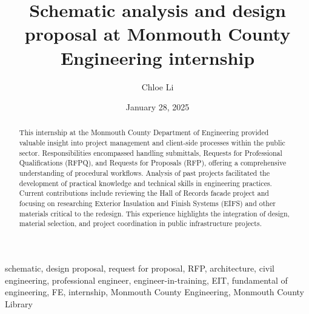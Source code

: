 \documentclass[12pt,conference,onecolumn]{IEEEtran}
\title{Schematic analysis and design proposal at Monmouth County Engineering internship}
\author{Chloe Li}
\date{January 28, 2025}
\begin{document}
\maketitle 

\begin{abstract}
This internship at the Monmouth County Department of Engineering provided valuable insight into project management and client-side processes within the public sector. Responsibilities encompassed handling submittals, Requests for Professional Qualifications (RFPQ), and Requests for Proposals (RFP), offering a comprehensive understanding of procedural workflows. Analysis of past projects facilitated the development of practical knowledge and technical skills in engineering practices. Current contributions include reviewing the Hall of Records facade project and focusing on researching Exterior Insulation and Finish Systems (EIFS) and other materials critical to the redesign. This experience highlights the integration of design, material selection, and project coordination in public infrastructure projects.
\end{abstract}

\begin{IEEEkeywords}
schematic, design proposal, request for proposal, RFP, architecture, civil engineering, professional engineer, engineer-in-training, EIT, fundamental of engineering, FE, internship, Monmouth County Engineering, Monmouth County Library
\end{IEEEkeywords}
\end{document}
